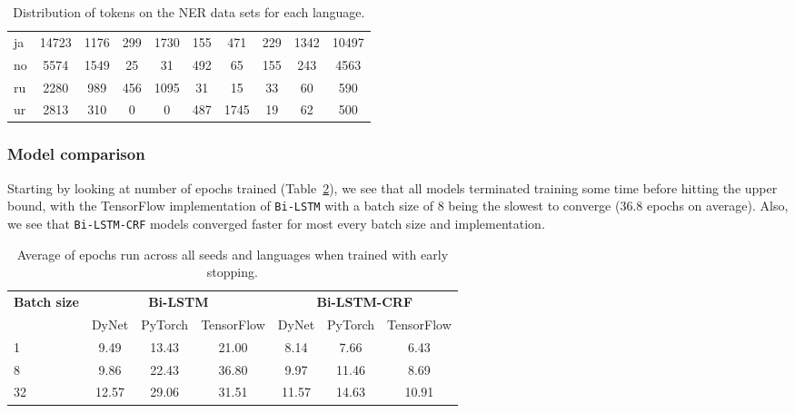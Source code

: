 \begin{table}[h!]
\begin{tabular}{l c c c c c c c c c}
        ja  &14723 & 1176 &
        299 & 1730 &  155 &  471 &  229 & 1342 &10497 \\

        no  & 5574 & 1549 &
         25 &   31 &  492 &   65 &  155 &  243 & 4563 \\

        ru  & 2280 &  989 &
        456 & 1095 &   31 &   15 &   33 &   60 &  590 \\

        ur  & 2813 &  310 &
          0 &    0 &  487 & 1745 &   19 &   62 &  500 \\
        \bottomrule
    \end{tabular}
    \caption{Distribution of tokens on the NER data sets for each language.
    }\label{table:token-distribution-ner}
\end{table}

\subsubsection{Model comparison}

Starting by looking at number of epochs trained
(Table~\ref{table:epochs-run-ner}), we see that all models terminated training
some time before hitting the upper bound, with the TensorFlow implementation of
\texttt{Bi-LSTM} with a batch size of 8 being the slowest to converge (36.8
epochs on average). Also, we see that \texttt{Bi-LSTM-CRF} models converged
faster for most every batch size and implementation.

\begin{table}[h!]
    \centering
    \begin{tabular}{l c c c|c c c}
        \toprule
        \multirow{2}{*}{\bfseries Batch size}     &
        \multicolumn{3}{c}{\bfseries Bi-LSTM}     &
        \multicolumn{3}{c}{\bfseries Bi-LSTM-CRF} \\
        \cmidrule(lr){2-7}
        & DyNet & PyTorch & TensorFlow
        & DyNet & PyTorch & TensorFlow \\
        \cmidrule(lr){1-7}
         1 &  9.49 & 13.43 & 21.00 &  8.14 &  7.66 &  6.43 \\
         8 &  9.86 & 22.43 & 36.80 &  9.97 & 11.46 &  8.69 \\
        32 & 12.57 & 29.06 & 31.51 & 11.57 & 14.63 & 10.91 \\
        \bottomrule
    \end{tabular}
    \caption{Average of epochs run across all seeds and languages when trained
        with early stopping.
        }\label{table:epochs-run-ner}
\end{table}

